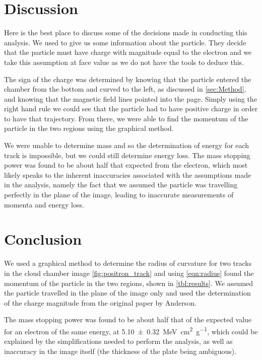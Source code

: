 \documentclass[11pt]{article}
\numberwithin{equation}{section}
\numberwithin{figure}{section}
\numberwithin{table}{section}
\begin{document}
\section{Discussion}\label{sec:Discussion}
Here is the best place to discuss some of the decisions made in conducting this analysis. We used \cite{Pos_Electron} to give us some information about the particle. They decide that the particle must have charge with magnitude equal to the electron and we take this assumption at face value as we do not have the tools to deduce this. 

The sign of the charge was determined by knowing that the particle entered the chamber from the bottom and curved to the left, as discussed in \cref{sec:Method}, and knowing that the magnetic field lines pointed into the page. Simply using the right hand rule we could see that the particle had to have positive charge in order to have that trajectory. From there, we were able to find the momentum of the particle in the two regions using the graphical method. 

We were unable to determine mass and so the determination of energy for each track is impossible, but we could still determine energy loss. The mass stopping power was found to be about half that expected from the electron, which most likely speaks to the inherent inaccuracies associated with the assumptions made in the analysis, namely the fact that we assumed the particle was travelling perfectly in the plane of the image, leading to inaccurate measurements of momenta and energy loss.

\section{Conclusion}\label{sec:Conclusion}
We used a graphical method to determine the radius of curvature for two tracks in the cloud chamber image \cref{fig:positron_track} and using \cref{eqn:radius} found the momentum of the particle in the two regions, shown in \cref{tbl:results}. We assumed the particle travelled in the plane of the image only and used the determination of the charge magnitude from the original paper by Anderson.

The mass stopping power was found to be about half that of the expected value for an electron of the same energy, at \SI{5.10\pm0.32}{\mega\electronvolt\centi\metre\squared\per\gram}, which could be explained by the simplifications needed to perform the analysis, as well as inaccuracy in the image itself (the thickness of the plate being ambiguous). 

\newpage
\printbibliography
\end{document}
